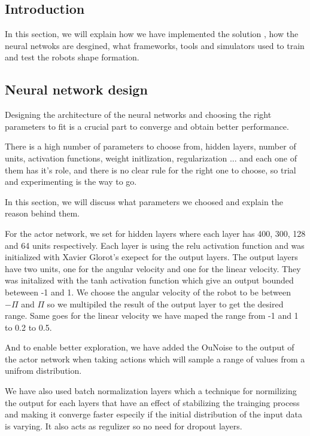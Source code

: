\documentclass[12pt]{extarticle}
\begin{document}
\pagebreak




\subsection{Introduction}
In this section, we will explain how we have implemented the solution , how the neural netwoks are desgined, what frameworks, tools and simulators used to train and test the robots shape formation. 




\subsection{Neural network design}
Designing the architecture of the neural networks and choosing the right parameters to fit is a crucial part to converge and obtain better performance.

There is a high  number of  parameters to choose from,  hidden layers, number of units, activation functions, weight initlization, regularization ... and each one of them has it's role, and there is no clear rule for the right one to choose, so trial and experimenting is the way to go.

In this section, we will discuss what parameters we choosed and explain the reason behind them.


For the actor network, we set for hidden layers where each layer has 400, 300, 128 and 64 units respectively. Each layer is using the relu activation function and was initialized with Xavier Glorot's exepect for the output layers. The output layers have two units, one for the angular velocity and one for the linear velocity. They was initalized with the tanh activation function which give an output bounded beteween -1 and 1. We choose the angular velocity of  the robot to be between $-\Pi$ and $\Pi$ so we multipiled the result of the output layer to get the desired range. Same goes for the linear velocity we have maped the range from -1 and 1 to 0.2 to 0.5. 

And to enable better exploration, we have added the OuNoise to the output of the actor network when taking actions which will sample a range of values from a unifrom distribution.


We have also used batch normalization layers \cite{ioffe2015batch} which a  technique for normilizing the output for each layers that have an effect of stabilizing the trainging process and making it converge faster especily if the initial distribution of the input data is varying. It also acts as regulizer so no need for dropout layers.
\end{document}
